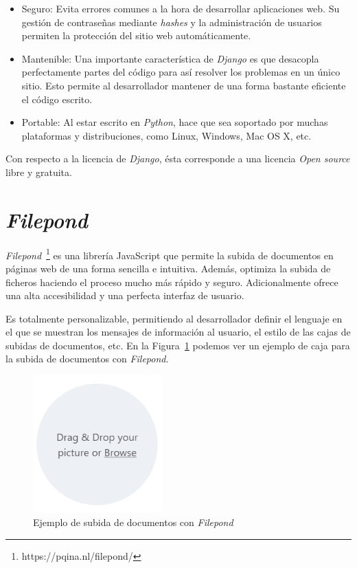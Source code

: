 \documentclass[a4paper, 12pt]{book}
\begin{document}
\begin{itemize}
  \item Seguro: Evita errores comunes a la hora de desarrollar aplicaciones
  web. Su gestión de contraseñas mediante \textit{hashes} y la administración
  de usuarios permiten la protección del sitio web automáticamente.
  
  \item Mantenible: Una importante característica de \textit{Django} es que desacopla
  perfectamente partes del código para así resolver los problemas en un
  único sitio. Esto permite al desarrollador mantener de una forma bastante
  eficiente el código escrito.
  
  \item Portable: Al estar escrito en \textit{Python}, hace que sea soportado por
  muchas plataformas y distribuciones, como Linux, Windows, Mac OS X, etc.
\end{itemize}

Con respecto a la licencia de \textit{Django}, ésta corresponde a una licencia
\textit{Open source} libre y gratuita.

\section{\textit{Filepond}}
\label{sec:filepond}

\textit{Filepond}~\footnote{https://pqina.nl/filepond/} es una librería JavaScript
que permite la subida de documentos en páginas web de una forma sencilla
e intuitiva. Además, optimiza la subida de ficheros haciendo el proceso mucho más
rápido y seguro. Adicionalmente ofrece una alta accesibilidad y una
perfecta interfaz de usuario.

Es totalmente personalizable, permitiendo al desarrollador definir
el lenguaje en el que se muestran los
mensajes de información al usuario, el estilo de las cajas de subidas
de documentos, etc. En la Figura~\ref{figura:ejemplo_filepond} podemos ver un ejemplo de
caja para la subida de documentos con \textit{Filepond}.

\begin{figure}
  \centering
  \includegraphics[width=5cm, keepaspectratio]{img/filepond_2}
  \caption{Ejemplo de subida de documentos con \textit{Filepond}}
  \label{figura:ejemplo_filepond}
\end{figure}
\end{document}
